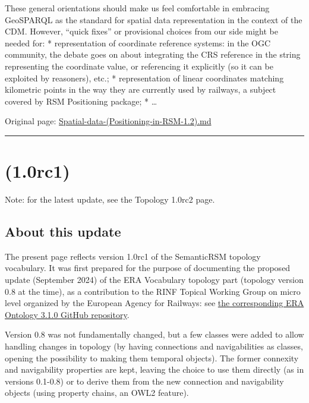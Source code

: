 \documentclass[
  11pt,
]{article}
\begin{document}
These general orientations should make us feel comfortable in embracing
GeoSPARQL as the standard for spatial data representation in the context
of the CDM. However, ``quick fixes'' or provisional choices from our
side might be needed for: * representation of coordinate reference
systems: in the OGC community, the debate goes on about integrating the
CRS reference in the string representing the coordinate value, or
referencing it explicitly (so it can be exploited by reasoners), etc.; *
representation of linear coordinates matching kilometric points in the
way they are currently used by railways, a subject covered by RSM
Positioning package; * \ldots{}

Original page:
\href{https://github.com/UICrail/CDM-RSM/wiki/Spatial-data-\%28Positioning-in-RSM-1.2\%29}{Spatial-data-(Positioning-in-RSM-1.2).md}

\begin{center}\rule{0.5\linewidth}{0.5pt}\end{center}

\hypertarget{rc1}{%
\section{(1.0rc1)}\label{rc1}}

Note: for the latest update, see the Topology 1.0rc2 page.

\hypertarget{about-this-update}{%
\subsection{About this update}\label{about-this-update}}

The present page reflects version 1.0rc1 of the SemanticRSM topology
vocabulary. It was first prepared for the purpose of documenting the
proposed update (September 2024) of the ERA Vocabulary topology part
(topology version 0.8 at the time), as a contribution to the RINF
Topical Working Group on micro level organized by the European Agency
for Railways: see
\href{https://github.com/Interoperable-data/ERA-Ontology-3.1.0/pull/109}{the
corresponding ERA Ontology 3.1.0 GitHub repository}.

Version 0.8 was not fundamentally changed, but a few classes were added
to allow handling changes in topology (by having connections and
navigabilities as classes, opening the possibility to making them
temporal objects). The former connexity and navigability properties are
kept, leaving the choice to use them directly (as in versions 0.1-0.8)
or to derive them from the new connection and navigability objects
(using property chains, an OWL2 feature).
\end{document}
